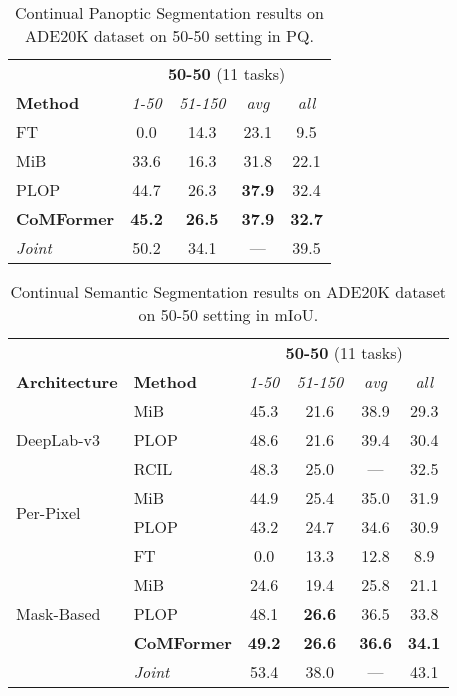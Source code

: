 \documentclass[10pt,twocolumn,letterpaper]{article}
\begin{document}
\begin{table}[t]
    \centering
    \begin{tabular}{l|cccc}
    \hline
\multicolumn{1}{c}{} & \multicolumn{4}{c}{{\textbf{50-50} (11 tasks)}} \\
\textbf{Method}       & \textit{1-50} & \textit{51-150} & \textit{avg} & \textit{all}  \\ \hline
FT                    &  0.0 &	14.3 &	23.1 & 	9.5  \\
MiB                   & 33.6 &	16.3 &	31.8 & 	22.1  \\
PLOP                  & 44.7 &	26.3 &	\textbf{37.9} & 	32.4  \\
\textbf{CoMFormer}    &\textbf{45.2} &	\textbf{26.5} &	\textbf{37.9} & 	\textbf{32.7}  \\ \hdashline
\textit{Joint}        & 50.2 &	34.1 &	---	 &  39.5 \\
\hline
    \end{tabular}
    \caption{Continual Panoptic Segmentation results on ADE20K dataset on 50-50 setting in PQ.}
    \label{tab:ade_pan_50}
\end{table}

\begin{table}[t]
    \centering
    \small
    \setlength{\tabcolsep}{4pt} \begin{tabular}{ll|cccc}
    \hline
\multicolumn{2}{c}{} & \multicolumn{4}{c}{{\textbf{50-50} (11 tasks)}} \\
\textbf{Architecture}       & \textbf{Method}       & \textit{1-50} & \textit{51-150} & \textit{avg} & \textit{all}  \\ \hline
\multirow{3}{*}{DeepLab-v3 \cite{chen2017deeplabv3}} 
& MiB \cite{cermelli2020modelingthebackground}  & 45.3 & 21.6 &	38.9 & 29.3 \\
& PLOP \cite{douillard2020plop}                 & 48.6 & 21.6 &	39.4 & 30.4 \\    
& RCIL \cite{zhang2022rcil}                     & 48.3 & 25.0 &	---  & 32.5 \\   \hline 
\multirow{2}{*}{Per-Pixel}
& MiB                     & 44.9 & 25.4 &	35.0 & 31.9  \\
& PLOP                    & 43.2 & 24.7 &	34.6 & 30.9  \\ \hline 
\multirow{5}{*}{Mask-Based}
& FT                      &  0.0	& 13.3 & 12.8 &	 8.9  \\
& MiB                     & 24.6	& 19.4 & 25.8 &	21.1  \\
& PLOP                    & 48.1	& \textbf{26.6} & 36.5 &	33.8  \\
& \textbf{CoMFormer}      & \textbf{49.2}	& \textbf{26.6} & \textbf{36.6} &	\textbf{34.1}  \\ \hdashline
& \textit{Joint}          & 53.4	& 38.0 &  --- &	43.1  \\
\hline
    \end{tabular}
    \caption{Continual Semantic Segmentation results on ADE20K dataset on 50-50 setting in mIoU.}
    \label{tab:ade_sem_50}
\end{table}
 
\end{document}
